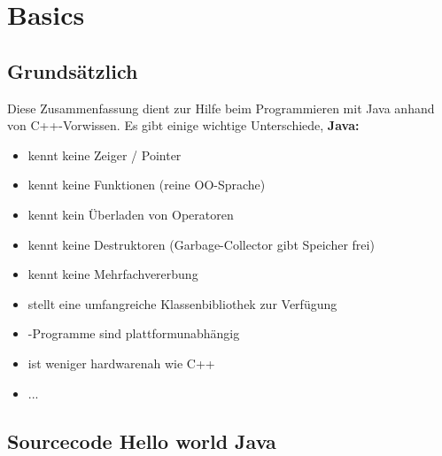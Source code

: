 \section{Basics}

\subsection{Grundsätzlich}

Diese Zusammenfassung dient zur Hilfe beim Programmieren mit Java anhand von C++-Vorwissen. Es gibt einige wichtige Unterschiede, \textbf{Java:}

\begin{itemize}[itemsep=1pt, parsep=0pt]
    \item kennt keine Zeiger / Pointer
    \item kennt keine Funktionen (reine OO-Sprache)
    \item kennt kein Überladen von Operatoren
    \item kennt keine Destruktoren (Garbage-Collector gibt Speicher frei)
    \item kennt keine Mehrfachvererbung
    \item stellt eine umfangreiche Klassenbibliothek zur Verfügung
    \item -Programme sind plattformunabhängig
    \item ist weniger hardwarenah wie C++
    \item ...
\end{itemize}

\subsection{Sourcecode Hello world Java}





% 



